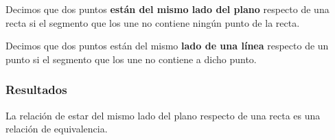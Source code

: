 
\begin{defin*}
	Decimos que dos puntos \textbf{están del mismo lado del plano} respecto de una
	recta si el segmento que los une no contiene ningún punto de la recta.
\end{defin*}


\begin{defin*}
	Decimos que dos puntos están del mismo \textbf{lado de una línea} respecto de
	un punto si el segmento que los une no contiene a dicho punto.
\end{defin*}



\subsubsection{Resultados}%




\begin{prop}
	La relación de estar del mismo lado del plano respecto de una recta es una
	relación de equivalencia.
\end{prop}
























